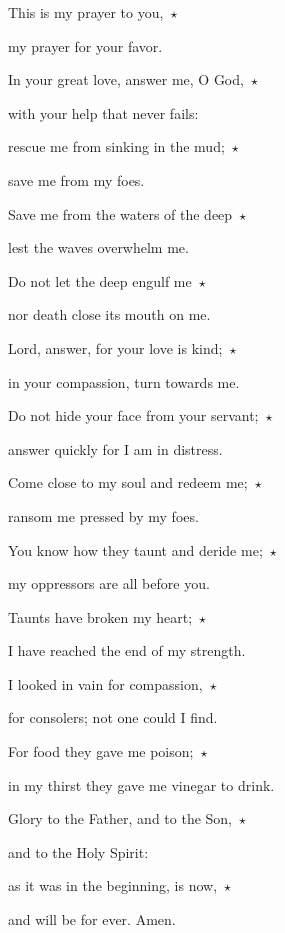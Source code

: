 \noindent This is my prayer to you,~$\star$~\nopagebreak

my prayer for your favor.

\noindent In your great love, answer me, O God,~$\star$~\nopagebreak

with your help that never fails:

\noindent rescue me from sinking in the mud;~$\star$~\nopagebreak

save me from my foes.

\noindent Save me from the waters of the deep~$\star$~\nopagebreak

lest the waves overwhelm me.

\noindent Do not let the deep engulf me~$\star$~\nopagebreak

nor death close its mouth on me.

\noindent Lord, answer, for your love is kind;~$\star$~\nopagebreak

in your compassion, turn towards me.

\noindent Do not hide your face from your servant;~$\star$~\nopagebreak

answer quickly for I am in distress.

\noindent Come close to my soul and redeem me;~$\star$~\nopagebreak

ransom me pressed by my foes.

\noindent You know how they taunt and deride me;~$\star$~\nopagebreak

my oppressors are all before you.

\noindent Taunts have broken my heart;~$\star$~\nopagebreak

I have reached the end of my strength.

\noindent I looked in vain for compassion,~$\star$~\nopagebreak

for consolers; not one could I find.

\noindent For food they gave me poison;~$\star$~\nopagebreak

in my thirst they gave me vinegar to drink.

\noindent Glory to the Father, and to the Son,~$\star$~\nopagebreak

and to the Holy Spirit:

\noindent as it was in the beginning, is now,~$\star$~\nopagebreak

and will be for ever. Amen.
